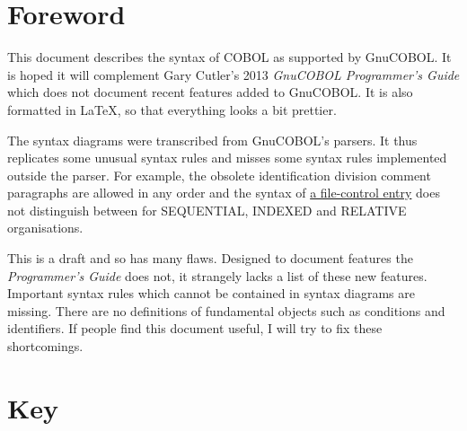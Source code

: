 \documentclass[a4paper,oneside,svgnames]{scrbook}
\newcounter{format}[subsection]
\begin{document}
\tableofcontents

\chapter{Foreword}

This document describes the syntax of COBOL as supported by GnuCOBOL. It is hoped it will complement Gary Cutler's 2013 \textit{GnuCOBOL Programmer's Guide} which does not document recent features added to GnuCOBOL. It is also formatted in \LaTeX, so that everything looks a bit prettier.

The syntax diagrams were transcribed from GnuCOBOL's parsers. It thus replicates some unusual syntax rules and misses some syntax rules implemented outside the parser. For example, the obsolete identification division comment paragraphs are allowed in any order and the syntax of \hyperref[file-control-entry]{a file-control entry} does not distinguish between for SEQUENTIAL, INDEXED and RELATIVE organisations.

This is a draft and so has many flaws. Designed to document features the \textit{Programmer's Guide} does not, it strangely lacks a list of these new features. Important syntax rules which cannot be contained in syntax diagrams are missing. There are no definitions of fundamental objects such as conditions and identifiers. If people find this document useful, I will try to fix these shortcomings.

\mainmatter

\renewcommand{\arraystretch}{1.2}
\setlength{\parskip}{\baselineskip}

\chapter{Key}
\end{document}
